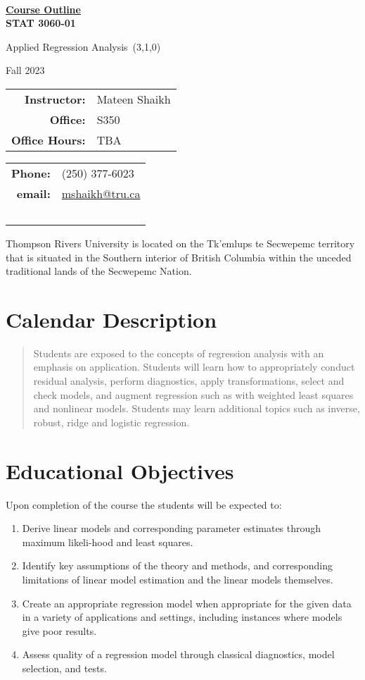 \documentclass[10pt]{trumathoutline}
\makeatletter
\newcommand{\instructorname}     {Mateen Shaikh}
\newcommand{\instructorphone}    {(250) 377-6023}
\newcommand{\instructoremail}    {mshaikh@tru.ca}
\newcommand{\instructorofficehrs}{TBA}
\newcommand{\instructorofficerm} {S350}
\newcommand{\coursecode}     	 {STAT 3060-01}
\newcommand{\coursetitle}    	 {Applied Regression Analysis}
\newcommand{\coursevectoring}	 {(3,1,0)}
\newcommand{\term}           	 {Fall 2023}
\newcommand{\calendardescription}{
	Students are exposed to the concepts of regression analysis with an emphasis on application. Students will learn how to appropriately conduct residual analysis, perform diagnostics, apply transformations, select and check models, and augment regression such as with weighted least squares and nonlinear models. Students may learn additional topics such as inverse, robust, ridge and logistic regression.
}
\newcommand{\coursedescription}{
}
\newcommand{\courseobjectives}{
	\begin{enumerate}
		\item Derive linear models and corresponding parameter estimates through maximum likeli-hood and least squares.
		\item 	Identify key assumptions of the theory and methods, and corresponding limitations of linear model estimation and the linear models themselves.
		\item	Create an appropriate regression model when appropriate for the given data in a variety of applications and settings, including instances where models give poor results.
		\item	Assess quality of a regression model through classical diagnostics, model selection, and tests.
	\end{enumerate}
}
\makeatother
\begin{document}
	
	~
	
	\vspace{-1em}
	
	\begin{center}
		\bfseries
		{\Large \underline{Course Outline}}\\[0.5em]
		
		\coursecode
		
		\coursetitle\ \coursevectoring
		
		\term
		
	\end{center}
\begin{tabular}{ r l}
	\textbf{Instructor:}	& \instructorname 	\\
	\textbf{Office:} 		& \instructorofficerm \\
	\textbf{Office Hours:} 	& \instructorofficehrs
\end{tabular}\hfill
\begin{tabular}{ r l}
	 \textbf{Phone:} & \instructorphone\\
	 \textbf{email:} & \href{mailto:\instructoremail}{\instructoremail}\\
	~
\end{tabular}

\vspace{1em}


Thompson Rivers University is located on the Tk’emlups te Secwepemc territory that is situated in the Southern interior of British Columbia within the unceded traditional lands of the Secwepemc Nation.

\section*{Calendar Description}
\begin{quote}
	\calendardescription
\end{quote}
	


\section*{Educational Objectives}
Upon completion of the course the students will be expected to:
\courseobjectives
\end{document}
